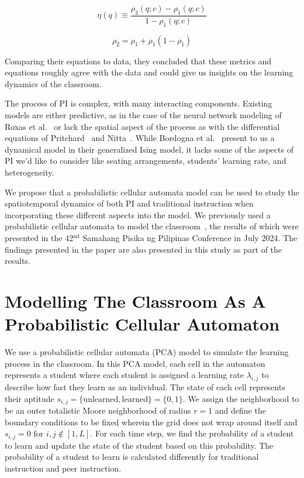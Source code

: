 \documentclass[twocolumn,secnumarabic,amssymb, nobibnotes, aps, prd]{revtex4-2}
\begin{document}
    \begin{equation}
        \label{eq: PIE}
        \eta(q) \equiv \frac{\rho_2(q;c)-\rho_1(q;c)}{1-\rho_1(q;c)}
    \end{equation}

    \begin{equation}
        \label{eq: nitta model}
        \rho_2 = \rho_1 +\rho_1(1-\rho_1)
    \end{equation}

    Comparing their equations to data, they concluded that these metrics and equations roughly agree with the data and could give us insights on the learning dynamics of the classroom.

    The process of PI is complex, with many interacting components.
    Existing models are either predictive, as in the case of the neural network modeling of Roxas et al.~\cite{roxas2010seating} or lack the spatial aspect of the process as with the differential equations of Pritchard~\cite{pritchard2008mathematical} and Nitta~\cite{nitta2019mathematical}.
    While Bordogna et al.~\cite{bordogna2001theoretical,bordogna2003simulation} present to us a dynamical model in their generalized Ising model, it lacks some of the aspects of PI we'd like to consider like seating arrangements, students' learning rate, and heterogeneity.

    We propose that a probabilistic cellular automata model can be used to study the spatiotemporal dynamics of both PI and traditional instruction when incorporating these different aspects into the model.
    We previously used a probabilistic cellular automata to model the classroom~\cite{SelfSPP}, the results of which were presented in the 42$^{\text{nd}}$ Samahang Pisika ng Pilipinas Conference in July 2024.
    The findings presented in the paper are also presented in this study as part of the results.

\section{Modelling The Classroom As A Probabilistic Cellular Automaton}

    We use a probabilistic cellular automata (PCA) model to simulate the learning process in the classroom.
    In this PCA model, each cell in the automaton represents a student where each student is assigned a learning rate $\lambda_{i,j}$ to describe how fast they learn as an individual.
    The state of each cell represents their aptitude $s_{i,j}=\lbrace\text{unlearned},\text{learned}\rbrace=\lbrace0,1\rbrace$.
    We assign the neighborhood to be an outer totalistic Moore neighborhood of radius $r=1$ and define the boundary conditions to be fixed wherein the grid does not wrap around itself and $s_{i,j}=0 \text{ for }i,j\notin[1,L]$.
    For each time step, we find the probability of a student to learn and update the state of the student based on this probability.
    The probability of a student to learn is calculated differently for traditional instruction and peer instruction.
\end{document}
